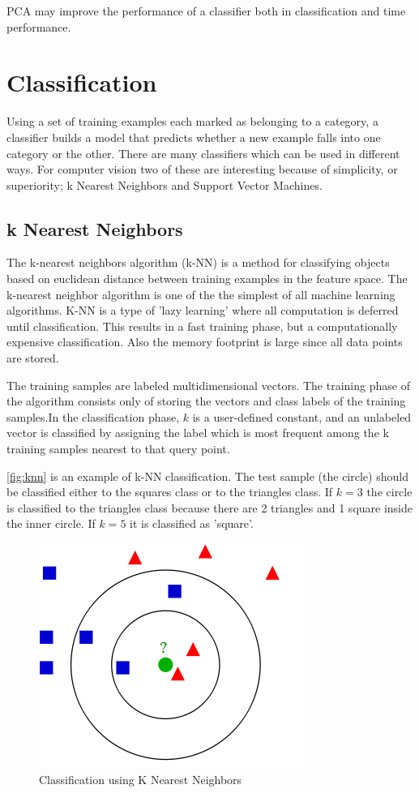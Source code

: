 PCA may improve the performance of a classifier both in classification and time performance.

\section{Classification}
Using a set of training examples each marked as belonging to a category, a classifier builds a model that predicts whether a new example falls into one category or the other. There are many classifiers which can be used in different ways. For computer vision two of these are interesting because of simplicity, or superiority; k Nearest Neighbors and Support Vector Machines.

\subsection*{k Nearest Neighbors}
The k-nearest neighbors algorithm (k-NN) is a method for classifying objects based on euclidean distance between training examples in the feature space. The k-nearest neighbor algorithm is one of the the simplest of all machine learning  algorithms. K-NN is a type of 'lazy learning' where all computation is deferred until classification. This results in a fast training phase, but a computationally expensive classification. Also the memory footprint is large since all data points are stored. 

The training samples are labeled multidimensional vectors. The training phase of the algorithm consists only of storing the vectors and class labels of the training samples.In the classification phase, $k$ is a user-defined constant, and an unlabeled vector is classified by assigning the label which is most frequent among the k training samples nearest to that query point.

\autoref{fig:knn} is an example of k-NN classification. The test sample (the circle) should be classified either to the squares class or to the triangles class. If $k = 3$ the circle is classified to the triangles class because there are 2 triangles and 1 square inside the inner circle. If $k = 5$ it is classified as 'square'.

\begin{figure}[htbp]
\center{}
\includegraphics[width=0.5\linewidth]{figures/knn.png}
\caption{Classification using K Nearest Neighbors}
\label{fig:knn}
\end{figure}





